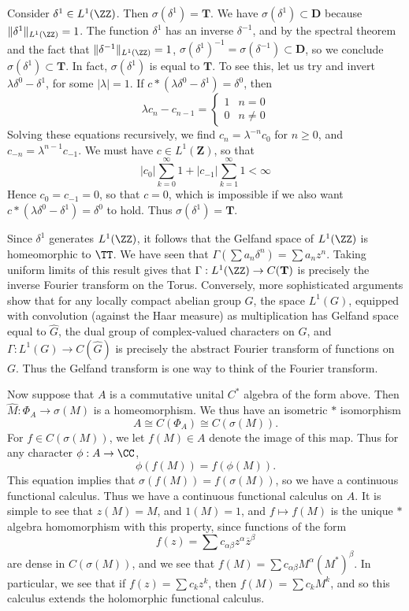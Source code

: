 \begin{example}
    Consider $\delta^1 \in L^1(\ZZ)$. Then $\sigma(\delta^1) = \mathbf{T}$. We have $\sigma(\delta^1) \subset \mathbf{D}$ because $\| \delta^1 \|_{L^1(\ZZ)} = 1$. The function $\delta^1$ has an inverse $\delta^{-1}$, and by the spectral theorem and the fact that $\| \delta^{-1} \|_{L^1(\ZZ)} = 1$, $\sigma(\delta^1)^{-1} = \sigma(\delta^{-1}) \subset \mathbf{D}$, so we conclude $\sigma(\delta^1) \subset \mathbf{T}$. In fact, $\sigma(\delta^1)$ is equal to $\mathbf{T}$. To see this, let us try and invert $\lambda \delta^0 - \delta^1$, for some $|\lambda| = 1$. If $c * (\lambda \delta^0 - \delta^1) = \delta^0$, then
    \[ \lambda c_n - c_{n-1} = \begin{cases} 1 & n = 0 \\ 0 & n \neq 0 \end{cases} \]
    Solving these equations recursively, we find $c_n = \lambda^{-n} c_0$ for $n \geq 0$, and $c_{-n} = \lambda^{n-1} c_{-1}$. We must have $c \in L^1(\mathbf{Z})$, so that
    \[ |c_0| \sum_{k = 0}^\infty 1 + |c_{-1}| \sum_{k = 1}^\infty 1 < \infty \]
    Hence $c_0 = c_{-1} = 0$, so that $c = 0$, which is impossible if we also want $c * (\lambda \delta^0 - \delta^1) = \delta^0$ to hold. Thus $\sigma(\delta^1) = \mathbf{T}$.

    Since $\delta^1$ generates $L^1(\ZZ)$, it follows that the Gelfand space of $L^1(\ZZ)$ is homeomorphic to $\TT$. We have seen that $\Gamma(\sum a_n \delta^n) = \sum a_n z^n$. Taking uniform limits of this result gives that $\Gamma: L^1(\ZZ) \to C(\mathbf{T})$ is precisely the inverse Fourier transform on the Torus. Conversely, more sophisticated arguments show that for any locally compact abelian group $G$, the space $L^1(G)$, equipped with convolution (against the Haar measure) as multiplication has Gelfand space equal to $\widehat{G}$, the dual group of complex-valued characters on $G$, and $\Gamma: L^1(G) \to C(\widehat{G})$ is precisely the abstract Fourier transform of functions on $G$. Thus the Gelfand transform is one way to think of the Fourier transform.
\end{example}

Now suppose that $A$ is a commutative unital $C^*$ algebra of the form above. Then $\widehat{M}: \Phi_A \to \sigma(M)$ is a homeomorphism. We thus have an isometric $*$ isomorphism
%
\[ A \cong C(\Phi_A) \cong C(\sigma(M)). \]
%
For $f \in C(\sigma(M))$, we let $f(M) \in A$ denote the image of this map. Thus for any character $\phi: A \to \CC$,
%
\[ \phi(f(M)) = f(\phi(M)). \]
%
This equation implies that $\sigma(f(M)) = f(\sigma(M))$, so we have a continuous functional calculus. Thus we have a continuous functional calculus on $A$. It is simple to see that $z(M) = M$, and $1(M) = 1$, and $f \mapsto f(M)$ is the unique $*$ algebra homomorphism with this property, since functions of the form
%
\[ f(z) = \sum c_{\alpha \beta} z^\alpha \overline{z}^\beta \]
%
are dense in $C(\sigma(M))$, and we see that $f(M) = \sum c_{\alpha \beta} M^\alpha (M^*)^\beta$. In particular, we see that if $f(z) = \sum c_k z^k$, then $f(M) = \sum c_k M^k$, and so this calculus extends the holomorphic functional calculus.

